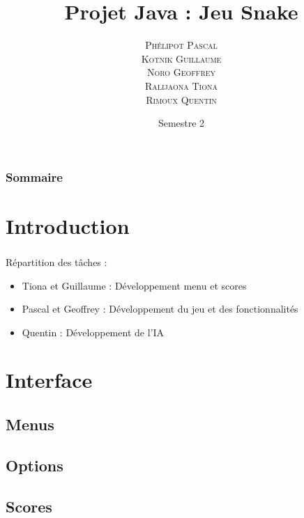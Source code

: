 \documentclass{beamer}
\author[\textsc{Phélipot\and Kotnik\and Noro\and Tiona\and Rimoux}]{\textsc{Phélipot Pascal\\ Kotnik Guillaume\\ Noro Geoffrey\\ Ralijaona Tiona\\ Rimoux Quentin}}
\title[Jeu Snake]{Projet Java : Jeu Snake}
\date{Semestre 2}
\begin{document}
\begin{frame}
\maketitle
\end{frame}

\begin{frame}
\frametitle{Sommaire}

\tableofcontents	
\end{frame}

\section{Introduction}
\begin{frame}
\frametitle{\insertsection}

Répartition des tâches :
\begin{itemize}
\item Tiona et Guillaume : Développement menu et scores
\item Pascal et Geoffrey : Développement du jeu et des fonctionnalités
\item Quentin : Développement de l'IA 
\end{itemize}
\end{frame}

\section{Interface}
\subsection{Menus}
\begin{frame}
\frametitle{\insertsubsection}
\framesubtitle{\insertsection}

\end{frame}
\subsection{Options}
\begin{frame}
\frametitle{\insertsubsection}
\framesubtitle{\insertsection}

\end{frame}
\subsection{Scores}
\begin{frame}
\frametitle{\insertsubsection}
\framesubtitle{\insertsection}

\end{frame}
\end{document}
